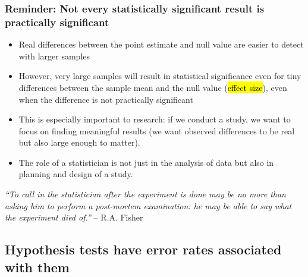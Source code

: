 \documentclass[slidestop,compress,mathserif,12pt,t,professionalfonts,xcolor=table]{beamer}
\begin{document}

\begin{frame}
\frametitle{Reminder: Not every statistically significant result is practically significant}

\begin{itemize}

\item Real differences between the point estimate and null value are easier to detect with larger samples

\item However, very large samples will result in statistical significance even for tiny differences between the 
sample mean and the null value (\hl{effect size}), even when the difference is not practically significant

\item This is especially important to research: if we conduct a study, we want to focus on finding meaningful 
results (we want observed differences to be real but also large enough to matter).

\item The role of a statistician is not just in the analysis of data but also in planning and design of a study.

\end{itemize}

\begin{center}
{\footnotesize \textit{``To call in the statistician after the experiment is done may be no more than asking him 
to perform a post-mortem examination: he may be able to say what the experiment died of.''} -- R.A. Fisher}
\end{center}

\end{frame}


\subsection{Hypothesis tests have error rates associated with them}
\label{mi2}

\end{document}
